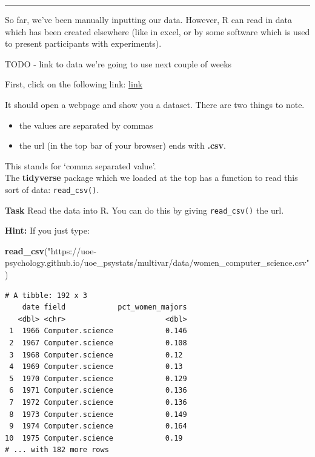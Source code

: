 \documentclass[12pt,]{krantz}
\newenvironment{Shaded}{\begin{snugshade}}{\end{snugshade}}
\newcommand{\KeywordTok}[1]{\textcolor[rgb]{0.13,0.29,0.53}{\textbf{#1}}}
\newcommand{\NormalTok}[1]{#1}
\newcommand{\StringTok}[1]{\textcolor[rgb]{0.31,0.60,0.02}{#1}}
\providecommand{\tightlist}{%
  \setlength{\itemsep}{0pt}\setlength{\parskip}{0pt}}
\begin{document}
\begin{center}\rule{0.5\linewidth}{0.5pt}\end{center}

So far, we've been manually inputting our data. However, R can read in data which has been created elsewhere (like in excel, or by some software which is used to present participants with experiments).

TODO - link to data we're going to use next couple of weeks

First, click on the following link: \href{https://uoe-psychology.github.io/uoe_psystats/multivar/data/women_computer_science.csv}{link}

It should open a webpage and show you a dataset.
There are two things to note.

\begin{itemize}
\tightlist
\item
  the values are separated by commas
\item
  the url (in the top bar of your browser) ends with \textbf{.csv}.
\end{itemize}

This stands for `comma separated value'.\\
The \textbf{tidyverse} package which we loaded at the top has a function to read this sort of data: \texttt{read\_csv()}.

\textbf{Task}
Read the data into R. You can do this by giving \texttt{read\_csv()} the url.

\textbf{Hint:} If you just type:

\begin{Shaded}
\begin{Highlighting}[]
\KeywordTok{read_csv}\NormalTok{(}\StringTok{"https://uoe-psychology.github.io/uoe_psystats/multivar/data/women_computer_science.csv"}\NormalTok{)}
\end{Highlighting}
\end{Shaded}

\begin{verbatim}
# A tibble: 192 x 3
    date field            pct_women_majors
   <dbl> <chr>                       <dbl>
 1  1966 Computer.science            0.146
 2  1967 Computer.science            0.108
 3  1968 Computer.science            0.12 
 4  1969 Computer.science            0.13 
 5  1970 Computer.science            0.129
 6  1971 Computer.science            0.136
 7  1972 Computer.science            0.136
 8  1973 Computer.science            0.149
 9  1974 Computer.science            0.164
10  1975 Computer.science            0.19 
# ... with 182 more rows
\end{verbatim}
\end{document}
